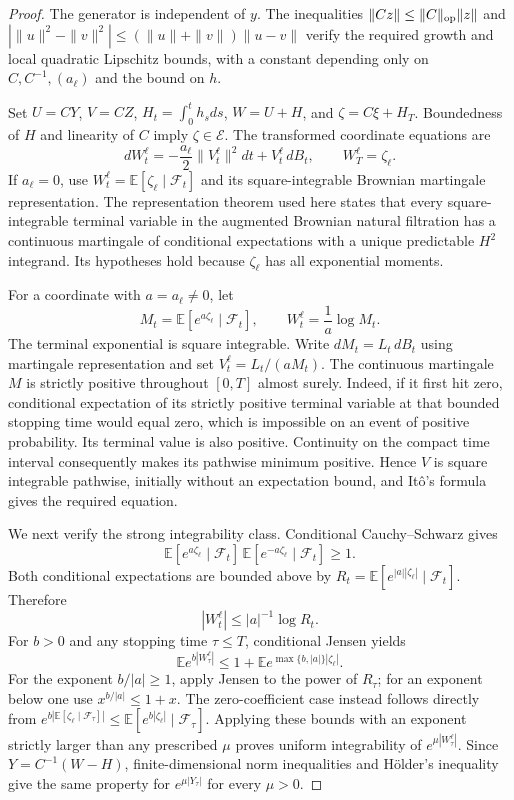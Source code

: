 \documentclass[11pt,a4paper]{article}
\newcommand{\E}{\mathbb E}
\theoremstyle{definition}
\theoremstyle{remark}
\begin{document}
\begin{proof}
The generator is independent of $y$. The inequalities
$\|Cz\|\leq\|C\|_{\rm op}\|z\|$ and
$|\|u\|^2-\|v\|^2|\leq(\|u\|+\|v\|)\|u-v\|$
verify the required growth and local quadratic Lipschitz bounds, with a constant depending only on $C,C^{-1},(a_\ell)$ and the bound on $h$.

Set $U=CY$, $V=CZ$, $H_t=\int_0^th_sds$, $W=U+H$, and $\zeta=C\xi+H_T$. Boundedness of $H$ and linearity of $C$ imply $\zeta\in\mathcal E$. The transformed coordinate equations are
\[
 dW_t^\ell=-\frac{a_\ell}{2}\|V_t^\ell\|^2dt+V_t^\ell\,dB_t,
 \qquad W_T^\ell=\zeta_\ell.
\]
If $a_\ell=0$, use $W_t^\ell=\E[\zeta_\ell\mid\mathcal F_t]$ and its square-integrable Brownian martingale representation. The representation theorem used here states that every square-integrable terminal variable in the augmented Brownian natural filtration has a continuous martingale of conditional expectations with a unique predictable $H^2$ integrand. Its hypotheses hold because $\zeta_\ell$ has all exponential moments.

For a coordinate with $a=a_\ell\ne0$, let
\[
 M_t=\E[e^{a\zeta_\ell}\mid\mathcal F_t],\qquad
 W_t^\ell=\frac1a\log M_t.
\]
The terminal exponential is square integrable. Write $dM_t=L_t\,dB_t$ using martingale representation and set $V_t^\ell=L_t/(aM_t)$. The continuous martingale $M$ is strictly positive throughout $[0,T]$ almost surely. Indeed, if it first hit zero, conditional expectation of its strictly positive terminal variable at that bounded stopping time would equal zero, which is impossible on an event of positive probability. Its terminal value is also positive. Continuity on the compact time interval consequently makes its pathwise minimum positive. Hence $V$ is square integrable pathwise, initially without an expectation bound, and It\^o's formula gives the required equation.

We next verify the strong integrability class. Conditional Cauchy--Schwarz gives
\[
 \E[e^{a\zeta_\ell}\mid\mathcal F_t]\,
 \E[e^{-a\zeta_\ell}\mid\mathcal F_t]\geq1.
\]
Both conditional expectations are bounded above by
$R_t=\E[e^{|a||\zeta_\ell|}\mid\mathcal F_t]$. Therefore
\[
 |W_t^\ell|\leq |a|^{-1}\log R_t.
\]
For $b>0$ and any stopping time $\tau\leq T$, conditional Jensen yields
\[
 \E e^{b|W_\tau^\ell|}
 \leq 1+\E e^{\max\{b,|a|\}|\zeta_\ell|}.
\]
For the exponent $b/|a|\geq1$, apply Jensen to the power of $R_\tau$; for an exponent below one use $x^{b/|a|}\leq1+x$. The zero-coefficient case instead follows directly from
$e^{b|\E[\zeta_\ell\mid\mathcal F_\tau]|}\leq\E[e^{b|\zeta_\ell|}\mid\mathcal F_\tau]$.
Applying these bounds with an exponent strictly larger than any prescribed $\mu$ proves uniform integrability of $e^{\mu|W^\ell_\tau|}$. Since $Y=C^{-1}(W-H)$, finite-dimensional norm inequalities and H\"older's inequality give the same property for $e^{\mu|Y_\tau|}$ for every $\mu>0$.


\end{proof}
\end{document}
